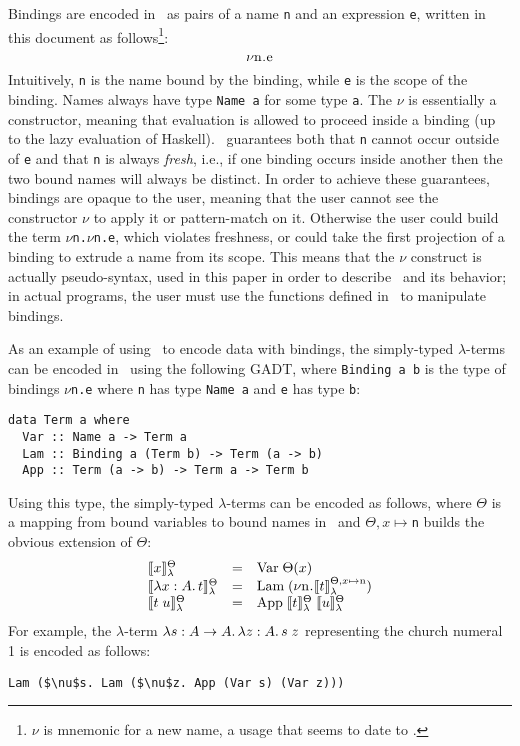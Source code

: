 \documentclass[natbib]{sigplanconf}
\begin{document}
Bindings are encoded in \ourlib\ as pairs of a name \lstinline{n} and
an expression \lstinline{e}, written in this document as
follows\footnote{ $\nu$ is mnemonic for a new name, a usage that seems
  to date to \citet{odersky94}.}:
\[
\nu\text{\lstinline{n.e}}
\]
Intuitively, \lstinline{n} is the name bound by the binding, while
\lstinline{e} is the scope of the binding. Names always have type
\lstinline{Name a} for some type \lstinline{a}.  The $\nu$ is
essentially a constructor, meaning that evaluation is allowed to
proceed inside a binding (up to the lazy evaluation of Haskell).
\ourlib\ guarantees both that \lstinline{n} cannot occur outside of
\lstinline{e} and that \lstinline{n} is always \emph{fresh}, i.e., if
one binding occurs inside another then the two bound names will always
be distinct. In order to achieve these guarantees, bindings are opaque
to the user, meaning that the user cannot see the constructor $\nu$ to
apply it or pattern-match on it. Otherwise the user could build the
term $\nu$\lstinline{n.}$\nu$\lstinline{n.e}, which violates
freshness, or could take the first projection of a binding to extrude
a name from its scope. This means that the $\nu$ construct is actually
pseudo-syntax, used in this paper in order to describe \ourlib\ and
its behavior; in actual programs, the user must use the functions
defined in \ourlib\ to manipulate bindings.

As an example of using \ourlib\ to encode data with bindings, the
simply-typed $\lambda$-terms can be encoded in \ourlib\ using the
following GADT, where \lstinline{Binding a b} is the type of bindings
$\nu$\lstinline{n.e} where \lstinline{n} has type \lstinline{Name a}
and \lstinline{e} has type \lstinline{b}:
\begin{lstlisting}
data Term a where
  Var :: Name a -> Term a
  Lam :: Binding a (Term b) -> Term (a -> b)
  App :: Term (a -> b) -> Term a -> Term b
\end{lstlisting}
Using this type, the simply-typed $\lambda$-terms can be encoded as
follows, where $\Theta$ is a mapping from bound variables to bound
names in \ourlib\ and $\Theta,x\mapsto$\lstinline{n} builds the
obvious extension of $\Theta$:
\[
\begin{array}{lcl}
\lcenc{\Theta}{x} & = & \text{\lstinline{Var}}\;\Theta(x)\\
\lcenc{\Theta}{\lamabs{x}{A}{t}} & = & \text{\lstinline{Lam}}\;(\nu\text{\lstinline{n.}}\lcenc{\Theta,x\mapsto \text{\lstinline{n}}}{t})\\
\lcenc{\Theta}{t\;u} & = & \text{\lstinline{App}}\;\lcenc{\Theta}{t}\;\lcenc{\Theta}{u}
\end{array}
\]
For example, the $\lambda$-term $\lambda s:A\to A.\, \lambda z:A.\, s\;z$
representing the church numeral 1 is encoded as follows:
\begin{lstlisting}[mathescape]
Lam ($\nu$s. Lam ($\nu$z. App (Var s) (Var z)))
\end{lstlisting}
\end{document}
